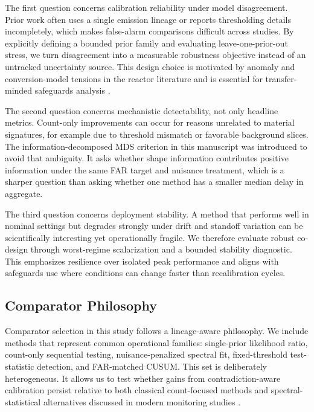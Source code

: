 The first question concerns calibration reliability under model disagreement. Prior work often uses a single emission lineage or reports thresholding details incompletely, which makes false-alarm comparisons difficult across studies. By explicitly defining a bounded prior family and evaluating leave-one-prior-out stress, we turn disagreement into a measurable robustness objective instead of an untracked uncertainty source. This design choice is motivated by anomaly and conversion-model tensions in the reactor literature and is essential for transfer-minded safeguards analysis \citep{SRC005,SRC015,SRC029,SRC030,SRC031}.

The second question concerns mechanistic detectability, not only headline metrics. Count-only improvements can occur for reasons unrelated to material signatures, for example due to threshold mismatch or favorable background slices. The information-decomposed MDS criterion in this manuscript was introduced to avoid that ambiguity. It asks whether shape information contributes positive information under the same FAR target and nuisance treatment, which is a sharper question than asking whether one method has a smaller median delay in aggregate.

The third question concerns deployment stability. A method that performs well in nominal settings but degrades strongly under drift and standoff variation can be scientifically interesting yet operationally fragile. We therefore evaluate robust co-design through worst-regime scalarization and a bounded stability diagnostic. This emphasizes resilience over isolated peak performance and aligns with safeguards use where conditions can change faster than recalibration cycles.

\subsection{Comparator Philosophy}
Comparator selection in this study follows a lineage-aware philosophy. We include methods that represent common operational families: single-prior likelihood ratio, count-only sequential testing, nuisance-penalized spectral fit, fixed-threshold test-statistic detection, and FAR-matched CUSUM. This set is deliberately heterogeneous. It allows us to test whether gains from contradiction-aware calibration persist relative to both classical count-focused methods and spectral-statistical alternatives discussed in modern monitoring studies \citep{SRC035,SRC034,SRC023,SRC022,SRC018,SRC017,SRC009,SRC001}.

